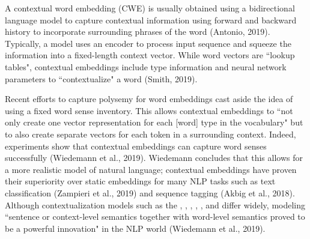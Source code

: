 A contextual word embedding (CWE) is usually obtained using a bidirectional language model to capture contextual information using forward and backward history to incorporate surrounding phrases of the word (Antonio, 2019). Typically, a model uses an encoder to process input sequence and squeeze the information into a fixed-length context vector. While word vectors are ``lookup tables", contextual embeddings include type information and neural network parameters to ``contextualize" a word (Smith, 2019). 

Recent efforts to capture polysemy for word embeddings cast aside the idea of using a fixed word sense inventory. This allows contextual embeddings to ``not only create one vector representation for each [word] type in the vocabulary" but to also create separate vectors for each token in a surrounding context. Indeed, experiments show that contextual embeddings can capture word senses successfully (Wiedemann et al., 2019). Wiedemann concludes that this allows for a more realistic model of natural language; contextual embeddings have proven their superiority over static embeddings for many NLP tasks such as text classification (Zampieri et al., 2019) and sequence tagging (Akbig et al., 2018). Although contextualization models such as the , , , , , and  differ widely, modeling ``sentence or context-level semantics together with word-level semantics proved to be a powerful innovation" in the NLP world (Wiedemann et al., 2019). 


